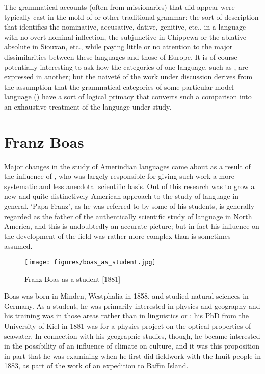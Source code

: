 The grammatical accounts (often from missionaries) that did appear
were typically cast in the mold of  or other traditional grammar:
the sort of description that identifies the nominative, accusative,
dative, genitive, etc., in a language with no overt nominal
inflection, the subjunctive in Chippewa or the ablative absolute in
Siouxan, etc., while paying little or no attention to the major
dissimilarities between these languages and those of Europe. It is of
course potentially interesting to ask how the categories of one
language, such as , are expressed in another; but the naiveté of
the work under discussion derives from the assumption that the
grammatical categories of some particular model language () have
a sort of logical primacy that converts such a comparison into an
exhaustive treatment of the language under study.

\section{Franz Boas}

Major changes in the study of Amerindian languages came about as a
result of the influence of , who was largely responsible for
giving such work a more systematic and less anecdotal scientific
basis. Out of this research was to grow a new and quite distinctively
American approach to the study of language in general. `Papa Franz',
as he was referred to by some of his students, is generally regarded
as the father of the authentically scientific study of language in
North America, and this is undoubtedly an accurate picture; but in
fact his influence on the development of the field was rather more
complex than is sometimes assumed.

\begin{wrapfigure}[14]{r}{.3\textwidth}
  \texttt{[image: figures/boas\_as\_student.jpg]}
  \caption{Franz Boas as a student [1881]}
  \label{fig:ch.boas.boas_student}
\end{wrapfigure}
Boas was born in Minden, Westphalia in 1858, and studied natural
sciences in Germany. As a student, he was primarily interested in
physics and geography and his training was in those areas rather than
in linguistics or : his PhD from the University of Kiel in
1881 was for a physics project on the optical properties of seawater.
In connection with his geographic studies, though, he became
interested in the possibility of an influence of climate on {culture},
and it was this proposition in part that he was examining when he
first did fieldwork with the Inuit people in 1883, as part of the work
of an expedition to Baffin Island.

